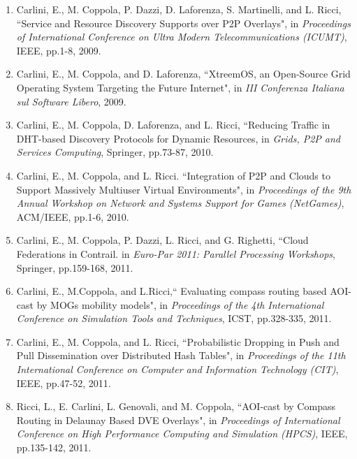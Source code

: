 \documentclass[final,10pt,a5paper]{phdimt}
\theoremstyle{definition}
\begin{document}
{\small
\begin{enumerate}



\item Carlini, E., M. Coppola, P. Dazzi, D. Laforenza, S. Martinelli, and L. Ricci, ``Service and Resource Discovery Supports over P2P Overlays", in \emph{Proceedings of International Conference on Ultra Modern Telecommunications (ICUMT)}, IEEE, pp.1-8, 2009.

\item Carlini, E., M. Coppola, and D. Laforenza, ``XtreemOS, an Open-Source Grid Operating System Targeting the Future Internet", in \emph{III Conferenza Italiana sul Software Libero}, 2009.

\item Carlini, E., M. Coppola, D. Laforenza, and L. Ricci, ``Reducing Traffic in DHT-based Discovery Protocols for Dynamic Resources, in \emph{Grids, P2P and Services Computing}, Springer, pp.73-87, 2010.

\item Carlini, E., M. Coppola, and L. Ricci. ``Integration of P2P and Clouds to Support Massively Multiuser Virtual Environments", in \emph{Proceedings of the 9th Annual Workshop on Network and Systems Support for Games (NetGames)}, ACM/IEEE, pp.1-6, 2010.

\item Carlini, E., M. Coppola, P. Dazzi, L. Ricci, and G. Righetti, ``Cloud Federations in Contrail. in \emph{Euro-Par 2011: Parallel Processing Workshops}, Springer, pp.159-168, 2011.

\item  Carlini, E., M.Coppola, and L.Ricci,`` Evaluating compass routing based AOI-cast by MOGs mobility models", in \emph{Proceedings of the 4th International Conference on Simulation Tools and Techniques}, ICST, pp.328-335, 2011.

\item Carlini, E., M. Coppola, and L. Ricci, ``Probabilistic Dropping in Push and Pull Dissemination over Distributed Hash Tables", in \emph{Proceedings of the 11th International Conference on Computer and Information Technology (CIT)}, IEEE, pp.47-52, 2011.

\item Ricci, L., E. Carlini, L. Genovali, and M. Coppola, ``AOI-cast by Compass Routing in Delaunay Based DVE Overlays", in \emph{Proceedings of International Conference on High Performance Computing and Simulation (HPCS)}, IEEE, pp.135-142, 2011.


\end{enumerate}}
\end{document}
